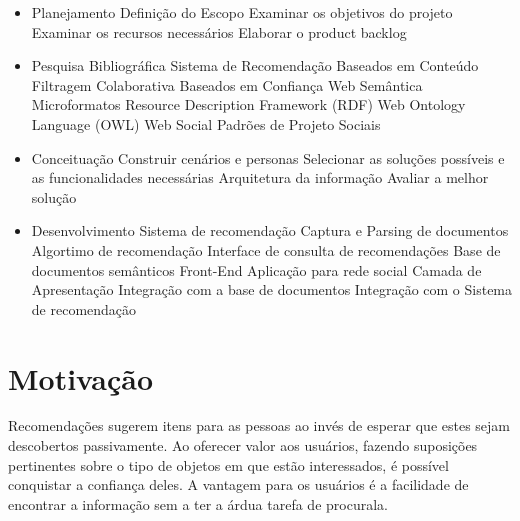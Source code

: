 \begin{itemize}

	\item Planejamento
		\subitem Definição do Escopo
			\subsubitem Examinar os objetivos do projeto
			\subsubitem Examinar os recursos necessários
			\subsubitem Elaborar o product backlog
		
	\item Pesquisa Bibliográfica
		\subitem Sistema de Recomendação
			\subsubitem Baseados em Conteúdo
			\subsubitem Filtragem Colaborativa
			\subsubitem Baseados em Confiança
		\subitem Web Semântica
			\subsubitem Microformatos
			\subsubitem Resource Description Framework (RDF)
			\subsubitem Web Ontology Language (OWL)
		\subitem Web Social
			\subsubitem Padrões de Projeto Sociais
	
	\item Conceituação
		\subitem Construir cenários e personas
		\subitem Selecionar as soluções possíveis e as funcionalidades necessárias
		\subitem Arquitetura da informação
		\subitem Avaliar a melhor solução
		
	\item Desenvolvimento
		\subitem Sistema de recomendação
			\subsubitem Captura e Parsing de documentos
			\subsubitem Algortimo de recomendação
			\subsubitem Interface de consulta de recomendações
		\subitem Base de documentos semânticos
		\subitem Front-End
			\subsubitem Aplicação para rede social
			\subsubitem Camada de Apresentação
			\subsubitem Integração com a base de documentos
			\subsubitem Integração com o Sistema de recomendação

\end{itemize}



\section{Motivação} %

 Recomendações sugerem itens para as pessoas ao invés de esperar que estes sejam descobertos passivamente. Ao oferecer valor aos usuários, fazendo suposições pertinentes sobre o tipo de objetos em que estão interessados, é possível conquistar a confiança deles. A vantagem para os usuários é a facilidade de encontrar a informação sem a ter a árdua tarefa de procurala.

